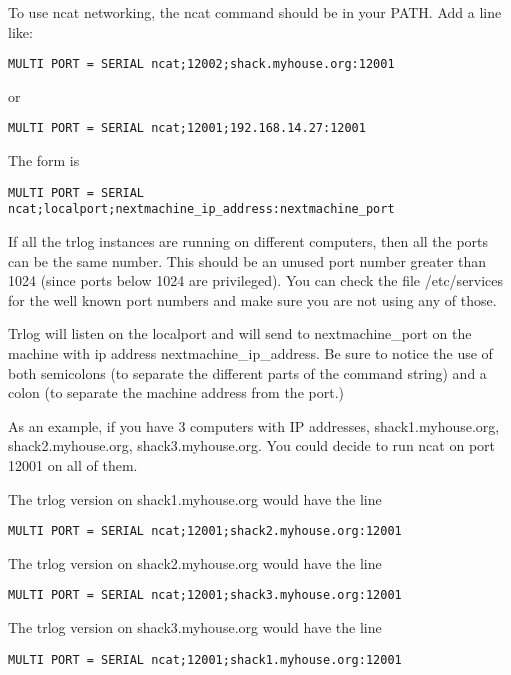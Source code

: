 \documentclass[12pt]{article}
\begin{document}
To use ncat networking, the ncat command should be in your PATH.
Add a line like:
\begin{verbatim}
MULTI PORT = SERIAL ncat;12002;shack.myhouse.org:12001
\end{verbatim}
or
\begin{verbatim}
MULTI PORT = SERIAL ncat;12001;192.168.14.27:12001
\end{verbatim}

The form is
\begin{verbatim}
MULTI PORT = SERIAL ncat;localport;nextmachine_ip_address:nextmachine_port
\end{verbatim}

If all the trlog instances are running on different computers, then
all the ports can be the same number. This should be an unused port
number greater than 1024 (since ports below 1024 are privileged).
You can check the file /etc/services for the well known port numbers
and make sure you are not using any of those.

Trlog will listen on the localport and will send to nextmachine\_port
on the machine with ip address nextmachine\_ip\_address. Be sure
to notice the use of both semicolons (to separate the different
parts of the command string) and a colon (to separate the machine
address from the port.)

As an example, if you have 3 computers with IP addresses,
shack1.myhouse.org, shack2.myhouse.org, shack3.myhouse.org. You could
decide to run ncat on port 12001 on all of them.

The trlog version on shack1.myhouse.org would have the line
\begin{verbatim}
MULTI PORT = SERIAL ncat;12001;shack2.myhouse.org:12001
\end{verbatim}

The trlog version on shack2.myhouse.org would have the line
\begin{verbatim}
MULTI PORT = SERIAL ncat;12001;shack3.myhouse.org:12001
\end{verbatim}

The trlog version on shack3.myhouse.org would have the line
\begin{verbatim}
MULTI PORT = SERIAL ncat;12001;shack1.myhouse.org:12001
\end{verbatim}
\end{document}
